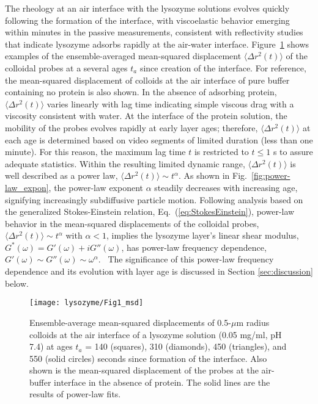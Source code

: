 The rheology at an air interface with the lysozyme solutions evolves quickly following the formation of the interface, with viscoelastic behavior emerging within minutes in the passive measurements, consistent with reflectivity studies that indicate lysozyme adsorbs rapidly at the air-water interface.\cite{Yano2009}  Figure~\ref{fig:emsds} shows examples of the ensemble-averaged mean-squared displacement $\langle \Delta r^2(t) \rangle$ of the colloidal probes at a several ages $t_a$ since creation of the interface.  For reference,  the mean-squared displacement of colloids at the air interface of pure buffer containing no protein is also shown.  In the absence of adsorbing protein, $\langle \Delta r^2(t) \rangle$ varies linearly with lag time indicating simple viscous drag with a viscosity consistent with water.  At the interface of the protein solution, the mobility of the probes evolves rapidly at early layer ages; therefore, $\langle \Delta r^2(t) \rangle$ at each age is determined based on video segments of limited duration (less than one minute).  For this reason, the maximum lag time $t$ is restricted to $ t \leq 1$ s to assure adequate statistics.  Within the resulting limited dynamic range, $\langle \Delta r^2(t) \rangle$ is well described as a power law, $\langle \Delta r^2(t) \rangle \sim t^{\alpha}$. As shown in Fig.~\ref{fig:power-law_expon}, the power-law exponent $\alpha$ steadily decreases with increasing age, signifying increasingly subdiffusive particle motion. Following analysis based on the generalized Stokes-Einstein relation, Eq.~(\ref{eq:StokesEinstein}), power-law behavior in the mean-squared displacements of the colloidal probes, $\langle \Delta r^2(t) \rangle \sim t^{\alpha}$ with $\alpha < 1$, implies the lysozyme layer's linear shear modulus, $G^*(\omega) = G'(\omega) + iG''(\omega)$, has power-law frequency dependence, $G'(\omega) \sim G''(\omega) \sim \omega^{\alpha}$.~\cite{Mason2000}  The significance of this power-law frequency dependence and its evolution with layer age is discussed in Section \ref{sec:discussion} below.


\begin{figure}
 \texttt{[image: lysozyme/Fig1\_msd]}
 \caption[Ensemble-average mean-squared displacements of colloids at the air interface]{\label{fig:emsds}Ensemble-average mean-squared displacements of 0.5-$\mu$m radius colloids at the air interface of a lysozyme solution (0.05 mg/ml, pH 7.4) at ages $t_a$ = 140 (squares), 310 (diamonds), 450 (triangles), and 550 (solid circles) seconds since formation of the interface.  Also shown is the mean-squared displacement of the probes at the air-buffer interface in the absence of protein.  The solid lines are the results of power-law fits.}
\end{figure}


